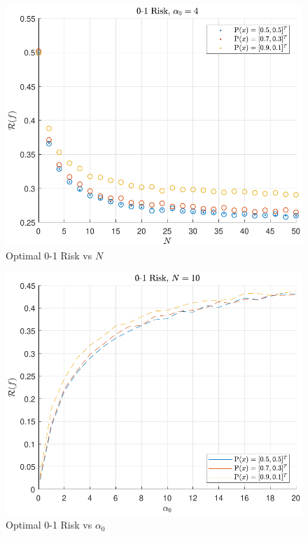 \documentclass[12pt]{report}
\begin{document}
\begin{figure}
\centering
\includegraphics[scale=1.0]{Risk_01_Dir_IO_N_leg_Px.pdf}
\caption{Optimal 0-1 Risk vs $N$}
\label{fig:Risk_01_Dir_IO_N_leg_Px}
\end{figure}

\begin{figure}
\centering
\includegraphics[scale=1.0]{Risk_01_Dir_IO_a0_leg_Px.pdf}
\caption{Optimal 0-1 Risk vs $\alpha_0$}
\label{fig:Risk_01_Dir_IO_a0_leg_Px}
\end{figure}
\end{document}
